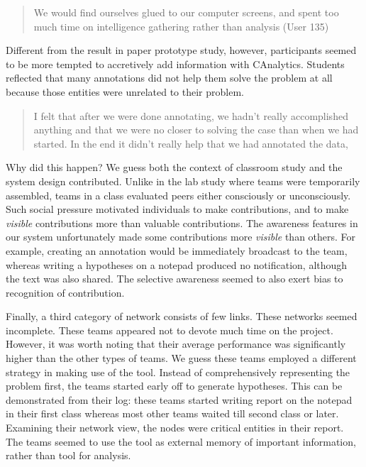 \documentclass[]{article}
\begin{document}
\begin{quote}
We would find ourselves glued to our computer screens, and spent too
much time on intelligence gathering rather than analysis (User 135)
\end{quote}

Different from the result in paper prototype study, however,
participants seemed to be more tempted to accretively add information
with CAnalytics. Students reflected that many annotations did not help
them solve the problem at all because those entities were unrelated to
their problem.

\begin{quote}
I felt that after we were done annotating, we hadn't really accomplished
anything and that we were no closer to solving the case than when we had
started. In the end it didn't really help that we had annotated the
data,
\end{quote}

Why did this happen? We guess both the context of classroom study and
the system design contributed. Unlike in the lab study where teams were
temporarily assembled, teams in a class evaluated peers either
consciously or unconsciously. Such social pressure motivated individuals
to make contributions, and to make \emph{visible} contributions more
than valuable contributions. The awareness features in our system
unfortunately made some contributions more \emph{visible} than others.
For example, creating an annotation would be immediately broadcast to
the team, whereas writing a hypotheses on a notepad produced no
notification, although the text was also shared. The selective awareness
seemed to also exert bias to recognition of contribution.

Finally, a third category of network consists of few links. These
networks seemed incomplete. These teams appeared not to devote much time
on the project. However, it was worth noting that their average
performance was significantly higher than the other types of teams. We
guess these teams employed a different strategy in making use of the
tool. Instead of comprehensively representing the problem first, the
teams started early off to generate hypotheses. This can be demonstrated
from their log: these teams started writing report on the notepad in
their first class whereas most other teams waited till second class or
later. Examining their network view, the nodes were critical entities in
their report. The teams seemed to use the tool as external memory of
important information, rather than tool for analysis.
\end{document}
